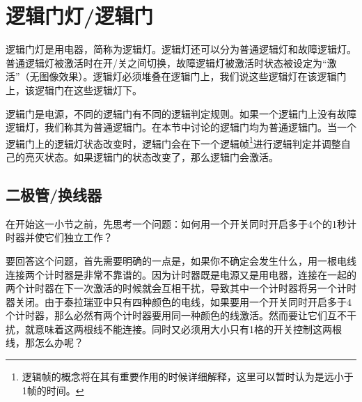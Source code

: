 \begin{figure}[!h]
\begin{center}
\qquad\qquad
{}
\end{center}
\caption{}
\label{i32:33}
\end{figure}



\section{逻辑门灯/逻辑门}

逻辑门灯是用电器，简称为逻辑灯。逻辑灯还可以分为普通逻辑灯和故障逻辑灯。普通逻辑灯被激活时在开/关之间切换，故障逻辑灯被激活时状态被设定为“激活”（无图像效果）。逻辑灯必须堆叠在逻辑门上，我们说这些逻辑灯在该逻辑门上，该逻辑门在这些逻辑灯下。

逻辑门是电源，不同的逻辑门有不同的逻辑判定规则。如果一个逻辑门上没有故障逻辑灯，我们称其为普通逻辑门。在本节中讨论的逻辑门均为普通逻辑门。当一个逻辑门上的逻辑灯状态改变时，逻辑门会在下一个逻辑帧\footnote{逻辑帧的概念将在其有重要作用的时候详细解释，这里可以暂时认为是远小于1帧的时间。}进行逻辑判定并调整自己的亮灭状态。如果逻辑门的状态改变了，那么逻辑门会激活。

\subsection{二极管/换线器}

在开始这一小节之前，先思考一个问题：如何用一个开关同时开启多于4个的1秒计时器并使它们独立工作？

要回答这个问题，首先需要明确的一点是，如果你不确定会发生什么，用一根电线连接两个计时器是非常不靠谱的。因为计时器既是电源又是用电器，连接在一起的两个计时器在下一次激活的时候就会互相干扰，导致其中一个计时器将另一个计时器关闭。由于泰拉瑞亚中只有四种颜色的电线，如果要用一个开关同时开启多于4个计时器，那么必然有两个计时器要用同一种颜色的线激活。然而要让它们互不干扰，就意味着这两根线不能连接。同时又必须用大小只有1格的开关控制这两根线，那怎么办呢？

